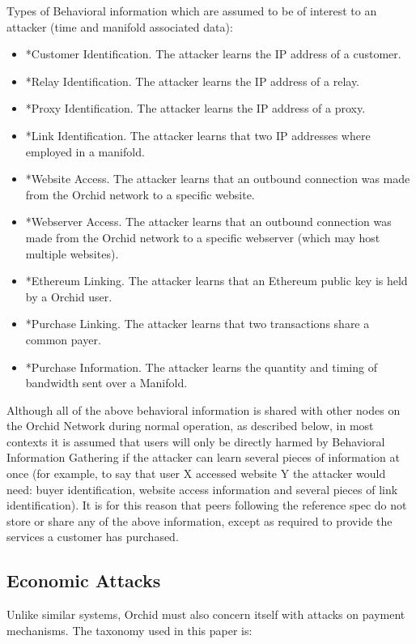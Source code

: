 \documentclass{article}
\newcommand{\mesh}{Orchid}
\begin{document}
Types of Behavioral information which are assumed to be of interest to an attacker (time and manifold associated data):

\begin{itemize}
\item *Customer Identification. The attacker learns the IP address of a customer.
\item *Relay Identification. The attacker learns the IP address of a relay.
\item *Proxy Identification. The attacker learns the IP address of a proxy.
\item *Link Identification. The attacker learns that two IP addresses where employed in a manifold.
\item *Website Access. The attacker learns that an outbound connection was made from the \mesh{} network to a specific website.
\item *Webserver Access. The attacker learns that an outbound connection was made from the \mesh{} network to a specific webserver (which may host multiple websites).
\item *Ethereum Linking. The attacker learns that an Ethereum public key is held by a \mesh{} user.
\item *Purchase Linking. The attacker learns that two transactions share a common payer.
\item *Purchase Information. The attacker learns the quantity and timing of bandwidth sent over a Manifold.
\end{itemize}

Although all of the above behavioral information is shared with other nodes on the \mesh{} Network during normal operation, as described below, in most contexts it is assumed that users will only be directly harmed by Behavioral Information Gathering if the attacker can learn several pieces of information at once (for example, to say that user X accessed website Y the attacker would need: buyer identification, website access information and several pieces of link identification). It is for this reason that peers following the reference spec do not store or share any of the above information, except as required to provide the services a customer has purchased.

\subsection{Economic Attacks}
\label{econ-attacks}

Unlike similar systems, \mesh{} must also concern itself with attacks on payment mechanisms. The taxonomy used in this paper is:
\end{document}
